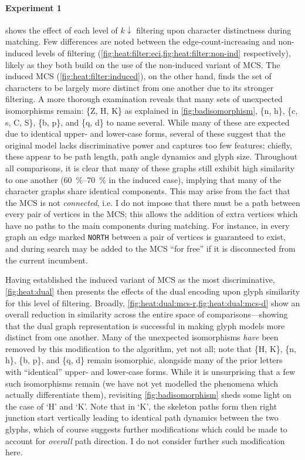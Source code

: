 \documentclass{mpaper}
\begin{document}
\paragraph{Experiment 1}
 shows the effect of each level of $k\downarrow$ filtering upon character distinctness during matching.
Few differences are noted between the edge-count-increasing and non-induced levels of filtering (\cref{fig:heat:filter:eci,fig:heat:filter:non-ind} respectively), likely as they both build on the use of the non-induced variant of MCS.
The induced MCS (\cref{fig:heat:filter:induced}), on the other hand, finds the set of characters to be largely more distinct from one another due to its stronger filtering.
A more thorough examination reveals that many sets of unexpected isomorphisms remain: \{Z, H, K\} as explained in \cref{fig:badisomorphism}, \{n, h\}, \{c, s, C, S\}, \{b, p\}, and \{q, d\} to name several.
While many of these are expected due to identical upper- and lower-case forms, several of these suggest that the original model lacks discriminative power and captures too few features; chiefly, these appear to be path length, path angle dynamics and glyph size.
Throughout all comparisons, it is clear that many of these graphs still exhibit high similarity to one another (\SIrange{60}{70}{\percent} in the induced case), implying that many of the character graphs share identical components.
This may arise from the fact that the MCS is not \emph{connected}, i.e. I do not impose that there must be a path between every pair of vertices in the MCS; this allows the addition of extra vertices which have no paths to the main components during matching.
For instance, in every graph an edge marked \texttt{NORTH} between a pair of vertices is guaranteed to exist, and during search may be added to the MCS ``for free'' if it is disconnected from the current incumbent.

Having established the induced variant of MCS as the most discriminative, \cref{fig:heat:dual} then presents the effects of the dual encoding upon glyph similarity for this level of filtering.
Broadly, \cref{fig:heat:dual:mcs-r,fig:heat:dual:mcs-d} show an overall reduction in similarity across the entire space of comparisons---showing that the dual graph representation is successful in making glyph models more distinct from one another.
Many of the unexpected isomorphisms \emph{have} been removed by this modification to the algorithm, yet not all; note that \{H, K\}, \{n, h\}, \{b, p\}, and \{q, d\} remain isomorphic, alongside many of the prior letters with ``identical'' upper- and lower-case forms.
While it is unsurprising that a few such isomorphisms remain (we have not yet modelled the phenomena which actually differentiate them), revisiting \cref{fig:badisomorphism} sheds some light on the case of `H' and `K'.
Note that in `K', the skeleton paths form then right junction start vertically leading to identical path dynamics between the two glyphs, which of course suggests further modifications which could be made to account for \emph{overall} path direction.
I do not consider further such modification here.
\end{document}
